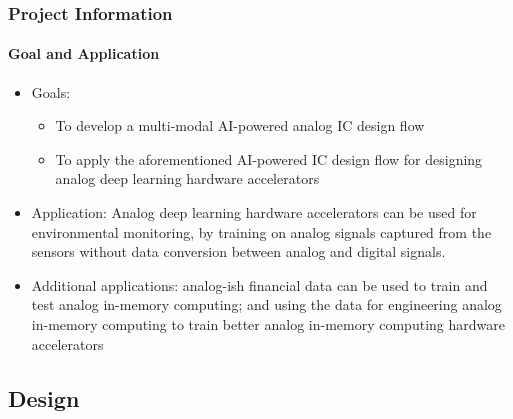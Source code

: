 \documentclass[xcolor={usenames,dvipsnames},hyperref={hyperindex,bookmarks}]{beamer}
\begin{document}
\begin{frame}
	\frametitle{Project Information}
	\framesubtitle{Goal and Application}
	
	\begin{itemize}
	\item Goals:
		\begin{itemize}
		\item To develop a multi-modal AI-powered analog IC design flow
		\item To apply the aforementioned AI-powered IC design flow for designing analog deep learning hardware accelerators
		\end{itemize}
	\item Application: Analog deep learning hardware accelerators can be used for environmental monitoring, by training on analog signals captured from the sensors without data conversion between analog and digital signals.
	\item Additional applications: analog-ish financial data can be used to train and test analog in-memory computing; and using the data for engineering analog in-memory computing to train better analog in-memory computing hardware accelerators
	\end{itemize}
	
	
\end{frame}



\subsection{Design}

\end{document}
